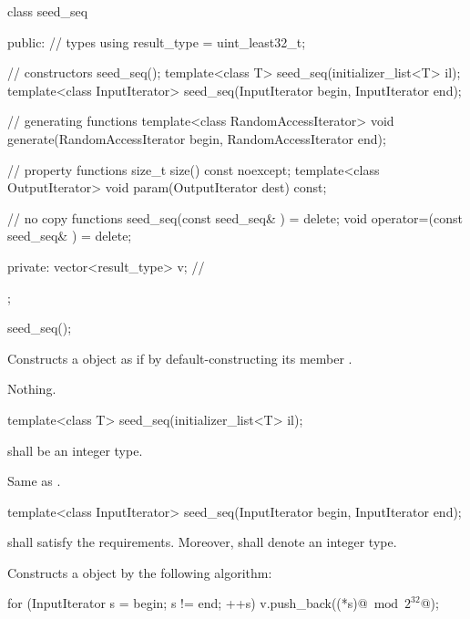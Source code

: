 %
\begin{codeblock}
class seed_seq {
public:
  // types
  using result_type = uint_least32_t;

  // constructors
  seed_seq();
  template<class T>
    seed_seq(initializer_list<T> il);
  template<class InputIterator>
    seed_seq(InputIterator begin, InputIterator end);

  // generating functions
  template<class RandomAccessIterator>
    void generate(RandomAccessIterator begin, RandomAccessIterator end);

  // property functions
  size_t size() const noexcept;
  template<class OutputIterator>
    void param(OutputIterator dest) const;

  // no copy functions
  seed_seq(const seed_seq& ) = delete;
  void operator=(const seed_seq& ) = delete;

private:
  vector<result_type> v;   // \expos
};
\end{codeblock}%


%
\begin{itemdecl}
seed_seq();
\end{itemdecl}

\begin{itemdescr}
\pnum\effects Constructs a  object
 as if by default-constructing its member .

\pnum
\throws Nothing.
\end{itemdescr}


%
\begin{itemdecl}
template<class T>
 seed_seq(initializer_list<T> il);
\end{itemdecl}

\begin{itemdescr}
\pnum\requires {} shall be an integer type.

\pnum\effects
 Same as .
\end{itemdescr}


%
\begin{itemdecl}
template<class InputIterator>
  seed_seq(InputIterator begin, InputIterator end);
\end{itemdecl}

\begin{itemdescr}
\pnum\requires
   shall satisfy the
   requirements.
  Moreover,
  shall denote an integer type.

\pnum\effects Constructs a  object
 by the following algorithm:
\begin{codeblock}
for (InputIterator s = begin; s != end; ++s)
 v.push_back((*s)@$\bmod 2^{32}$@);
\end{codeblock}%
\end{itemdescr}

